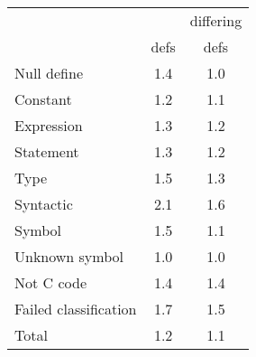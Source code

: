 \begin{tabular}{|l|c|c|} \hline
 & & \multicolumn{1}{c|}{differing} \\
 & \multicolumn{1}{c|}{defs} & \multicolumn{1}{c|}{defs} \\ \hline
Null define &            1.4 &                    1.0 \\
Constant &               1.2 &                    1.1 \\
Expression &             1.3 &                    1.2 \\
Statement &              1.3 &                    1.2 \\
Type &                   1.5 &                    1.3 \\
Syntactic &              2.1 &                    1.6 \\
Symbol &                 1.5 &                    1.1 \\
Unknown symbol &         1.0 &                    1.0 \\
Not C code &             1.4 &                    1.4 \\
Failed classification &  1.7 &                    1.5 \\ \hline
Total &                  1.2 &                    1.1 \\ \hline
\end{tabular}

